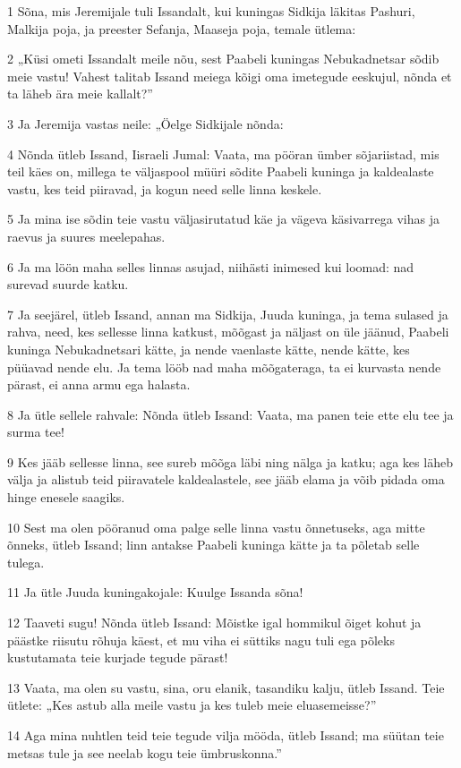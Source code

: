 \par 1 Sõna, mis Jeremijale tuli Issandalt, kui kuningas Sidkija läkitas Pashuri, Malkija poja, ja preester Sefanja, Maaseja poja, temale ütlema:
\par 2 „Küsi ometi Issandalt meile nõu, sest Paabeli kuningas Nebukadnetsar sõdib meie vastu! Vahest talitab Issand meiega kõigi oma imetegude eeskujul, nõnda et ta läheb ära meie kallalt?”
\par 3 Ja Jeremija vastas neile: „Öelge Sidkijale nõnda:
\par 4 Nõnda ütleb Issand, Iisraeli Jumal: Vaata, ma pööran ümber sõjariistad, mis teil käes on, millega te väljaspool müüri sõdite Paabeli kuninga ja kaldealaste vastu, kes teid piiravad, ja kogun need selle linna keskele.
\par 5 Ja mina ise sõdin teie vastu väljasirutatud käe ja vägeva käsivarrega vihas ja raevus ja suures meelepahas.
\par 6 Ja ma löön maha selles linnas asujad, niihästi inimesed kui loomad: nad surevad suurde katku.
\par 7 Ja seejärel, ütleb Issand, annan ma Sidkija, Juuda kuninga, ja tema sulased ja rahva, need, kes sellesse linna katkust, mõõgast ja näljast on üle jäänud, Paabeli kuninga Nebukadnetsari kätte, ja nende vaenlaste kätte, nende kätte, kes püüavad nende elu. Ja tema lööb nad maha mõõgateraga, ta ei kurvasta nende pärast, ei anna armu ega halasta.
\par 8 Ja ütle sellele rahvale: Nõnda ütleb Issand: Vaata, ma panen teie ette elu tee ja surma tee!
\par 9 Kes jääb sellesse linna, see sureb mõõga läbi ning nälga ja katku; aga kes läheb välja ja alistub teid piiravatele kaldealastele, see jääb elama ja võib pidada oma hinge enesele saagiks.
\par 10 Sest ma olen pööranud oma palge selle linna vastu õnnetuseks, aga mitte õnneks, ütleb Issand; linn antakse Paabeli kuninga kätte ja ta põletab selle tulega.
\par 11 Ja ütle Juuda kuningakojale: Kuulge Issanda sõna!
\par 12 Taaveti sugu! Nõnda ütleb Issand: Mõistke igal hommikul õiget kohut ja päästke riisutu rõhuja käest, et mu viha ei süttiks nagu tuli ega põleks kustutamata teie kurjade tegude pärast!
\par 13 Vaata, ma olen su vastu, sina, oru elanik, tasandiku kalju, ütleb Issand. Teie ütlete: „Kes astub alla meile vastu ja kes tuleb meie eluasemeisse?”
\par 14 Aga mina nuhtlen teid teie tegude vilja mööda, ütleb Issand; ma süütan teie metsas tule ja see neelab kogu teie ümbruskonna.”

